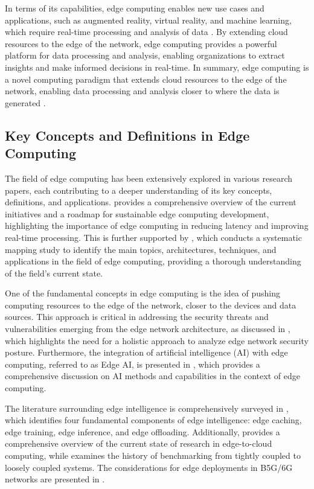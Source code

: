 \documentclass[11pt]{article}
\begin{document}
In terms of its capabilities, edge computing enables new use cases and applications, such as augmented reality, virtual reality, and machine learning, which require real-time processing and analysis of data \cite{ref7}. By extending cloud resources to the edge of the network, edge computing provides a powerful platform for data processing and analysis, enabling organizations to extract insights and make informed decisions in real-time. In summary, edge computing is a novel computing paradigm that extends cloud resources to the edge of the network, enabling data processing and analysis closer to where the data is generated \cite{ref8}.

\subsection{Key Concepts and Definitions in Edge Computing}

The field of edge computing has been extensively explored in various research papers, each contributing to a deeper understanding of its key concepts, definitions, and applications. \cite{ref1} provides a comprehensive overview of the current initiatives and a roadmap for sustainable edge computing development, highlighting the importance of edge computing in reducing latency and improving real-time processing. This is further supported by \cite{ref8}, which conducts a systematic mapping study to identify the main topics, architectures, techniques, and applications in the field of edge computing, providing a thorough understanding of the field's current state.

One of the fundamental concepts in edge computing is the idea of pushing computing resources to the edge of the network, closer to the devices and data sources. This approach is critical in addressing the security threats and vulnerabilities emerging from the edge network architecture, as discussed in \cite{ref3}, which highlights the need for a holistic approach to analyze edge network security posture. Furthermore, the integration of artificial intelligence (AI) with edge computing, referred to as Edge AI, is presented in \cite{ref9}, which provides a comprehensive discussion on AI methods and capabilities in the context of edge computing.

The literature surrounding edge intelligence is comprehensively surveyed in \cite{ref10}, which identifies four fundamental components of edge intelligence: edge caching, edge training, edge inference, and edge offloading. Additionally, \cite{ref11} provides a comprehensive overview of the current state of research in edge-to-cloud computing, while \cite{ref12} examines the history of benchmarking from tightly coupled to loosely coupled systems. The considerations for edge deployments in B5G/6G networks are presented in \cite{ref13}.
\end{document}
